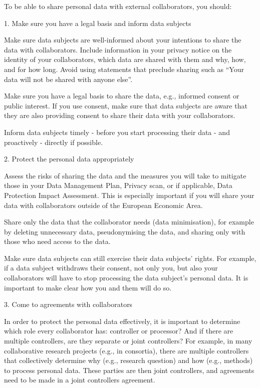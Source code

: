 \documentclass[
]{book}
\begin{document}
To be able to share personal data with external collaborators, you should:

1. Make sure you have a legal basis and
inform data subjects

Make sure data subjects are well-informed about your intentions to
share the data with collaborators. Include information in your
privacy notice on the identity of your
collaborators, which data are shared with them and why, how, and for how
long. Avoid using statements that preclude sharing such as ``Your data
will not be shared with anyone else''.

Make sure you have a legal basis to
share the data, e.g., informed consent or public interest. If you use
consent, make sure that data subjects are aware that they are also
providing consent to share their data with your collaborators.

Inform data subjects timely - before you start processing
their data - and proactively - directly if possible.

2. Protect the personal data appropriately

Assess the risks of sharing the
data and the measures you will take to mitigate those in your
Data Management Plan, Privacy scan,
or if applicable, Data Protection Impact Assessment.
This is especially important if you will share your data with
collaborators outside of the European Economic Area.

Share only the data that the collaborator needs (data minimisation),
for example by deleting unnecessary data, pseudonymising the data, and
sharing only with those who need access to the data.

Make sure data subjects can still exercise their
data subjects' rights. For example,
if a data subject withdraws their consent, not only you, but also your
collaborators will have to stop processing the data subject's personal
data. It is important to make clear how you and them will do so.

3. Come to agreements with collaborators

In order to protect the personal data effectively, it is important to
determine which role every collaborator has:
controller or processor? And if there are
multiple controllers, are they separate or joint controllers? For example,
in many collaborative research projects (e.g., in consortia), there are
multiple controllers that collectively determine why (e.g., research
question) and how (e.g., methods) to process personal data. These parties
are then joint controllers, and agreements need to be made in a
joint controllers agreement.
\end{document}
